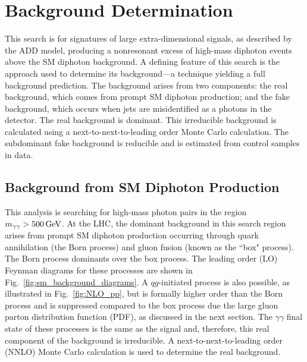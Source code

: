 \chapter{Background Determination}\label{ch:background}

This search is for signatures of large extra-dimensional signals, as described by the ADD model, producing a nonresonant excess of high-mass diphoton events above the SM diphoton background. A defining feature of this search is the approach used to determine its background---a technique yielding a full background prediction. The background arises from two components: the real background, which comes from prompt SM diphoton production; and the fake background, which occurs when jets are misidentified as a photons in the detector. The real background is dominant. This irreducible background is calculated using a next-to-next-to-leading order Monte Carlo calculation. The subdominant fake background is reducible and is estimated from control samples in data. 


\section{Background from SM Diphoton Production}\label{sec:real_background}

This analysis is searching for high-mass photon pairs in the region $m_{\gamma\gamma}>500\,\text{Ge\hspace{-.08em}V}$. At the LHC, the dominant background in this search region arises from prompt SM diphoton production occurring through quark annihilation (the Born process) and gluon fusion (known as the ``box" process). The Born process dominants over the box process. The leading order (LO) Feynman diagrams for these processes are shown in Fig.~\ref{fig:sm_background_diagrams}. A $qg$-initiated process is also possible, as illustrated in Fig.~\ref{fig:NLO_pp}, but is formally higher order than the Born process and is suppressed compared to the box process due the large gluon parton distribution function (PDF), as discussed in the next section. The $\gamma\gamma$ final state of these processes is the same as the signal and, therefore, this real component of the background is irreducible. A next-to-next-to-leading order (NNLO) Monte Carlo calculation is used to determine the real background.

